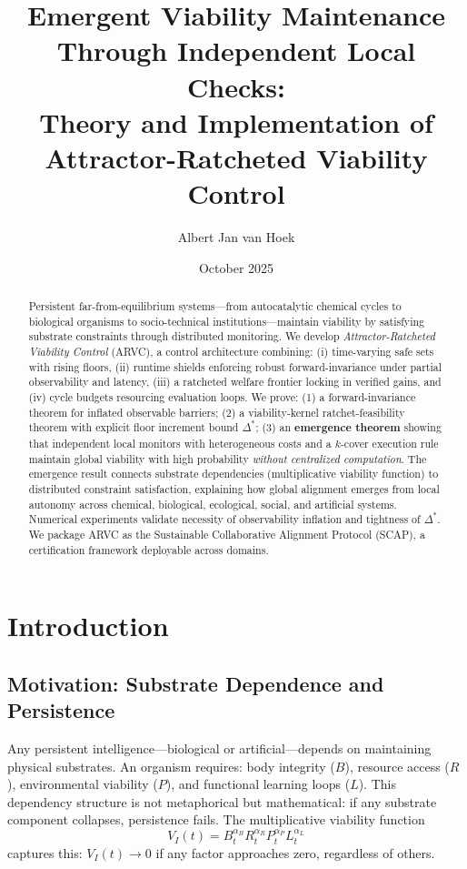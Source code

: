 \documentclass[11pt,a4paper]{article}
\title{Emergent Viability Maintenance Through Independent Local Checks: \\ Theory and Implementation of Attractor-Ratcheted Viability Control}
\author{Albert Jan van Hoek}
\date{October 2025}
\begin{document}
\maketitle

\begin{abstract}
Persistent far-from-equilibrium systems—from autocatalytic chemical cycles to biological organisms to socio-technical institutions—maintain viability by satisfying substrate constraints through distributed monitoring. We develop \emph{Attractor-Ratcheted Viability Control} (ARVC), a control architecture combining: (i) time-varying safe sets with rising floors, (ii) runtime shields enforcing robust forward-invariance under partial observability and latency, (iii) a ratcheted welfare frontier locking in verified gains, and (iv) cycle budgets resourcing evaluation loops. We prove: (1) a forward-invariance theorem for inflated observable barriers; (2) a viability-kernel ratchet-feasibility theorem with explicit floor increment bound $\Delta^*$; (3) an \textbf{emergence theorem} showing that independent local monitors with heterogeneous costs and a $k$-cover execution rule maintain global viability with high probability \emph{without centralized computation}. The emergence result connects substrate dependencies (multiplicative viability function) to distributed constraint satisfaction, explaining how global alignment emerges from local autonomy across chemical, biological, ecological, social, and artificial systems. Numerical experiments validate necessity of observability inflation and tightness of $\Delta^*$. We package ARVC as the Sustainable Collaborative Alignment Protocol (SCAP), a certification framework deployable across domains.
\end{abstract}

\section{Introduction}

\subsection{Motivation: Substrate Dependence and Persistence}

Any persistent intelligence—biological or artificial—depends on maintaining physical substrates. An organism requires: body integrity ($B$), resource access ($R$), environmental viability ($P$), and functional learning loops ($L$). This dependency structure is not metaphorical but mathematical: if any substrate component collapses, persistence fails. The multiplicative viability function
\begin{equation}
V_I(t) = B_t^{\alpha_B} R_t^{\alpha_R} P_t^{\alpha_P} L_t^{\alpha_L}
\end{equation}
captures this: $V_I(t) \to 0$ if any factor approaches zero, regardless of others.
\end{document}
